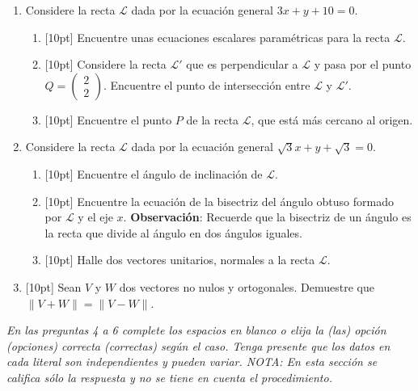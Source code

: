 \documentclass[11pt]{article}
\newcommand{\vect}[2]{\begin{pmatrix}#1\\#2\end{pmatrix}}
\newcommand{\nota}[1]{{\small\itshape\color{unalblue!70!black} #1}}
\begin{document}
\begin{enumerate}
\item Considere la recta $\mathcal{L}$ dada por la ecuación general $3x+y+10=0$.

\begin{enumerate}[label=(\alph*)]
\item{}[10pt] Encuentre unas ecuaciones escalares paramétricas para la recta $\mathcal{L}$.
\item{}[10pt] Considere la recta $\mathcal{L}'$ que es perpendicular a $\mathcal{L}$ y pasa por el punto $Q=\vect{2}{2}$. Encuentre el punto de intersección entre $\mathcal{L}$ y $\mathcal{L}'$.
\item{}[10pt] Encuentre el punto $P$ de la recta $\mathcal{L}$, que está más cercano al origen.
\end{enumerate}

\item Considere la recta $\mathcal{L}$ dada por la ecuación general $\sqrt{3}x+y+\sqrt{3}=0$.

\begin{enumerate}[label=(\alph*)]
\item{}[10pt] Encuentre el ángulo de inclinación de $\mathcal{L}$.
\item{}[10pt] Encuentre la ecuación de la bisectriz del ángulo obtuso formado por $\mathcal{L}$ y el eje $x$. \textbf{Observación}: Recuerde que la bisectriz de un ángulo es la recta que divide al ángulo en dos ángulos iguales.
\item{}[10pt] Halle dos vectores unitarios, normales a la recta $\mathcal{L}$.
\end{enumerate}

\item{}[10pt] Sean $V$ y $W$ dos vectores no nulos y ortogonales. Demuestre que $\|V+W\|=\|V-W\|$.
\end{enumerate}

\vspace{6pt}
\nota{En las preguntas 4 a 6 complete los espacios en blanco o elija la (las) opción (opciones) correcta (correctas) según el caso. Tenga presente que los datos en cada literal son independientes y pueden variar. NOTA: En esta sección se califica sólo la respuesta y no se tiene en cuenta el procedimiento.}
\end{document}
